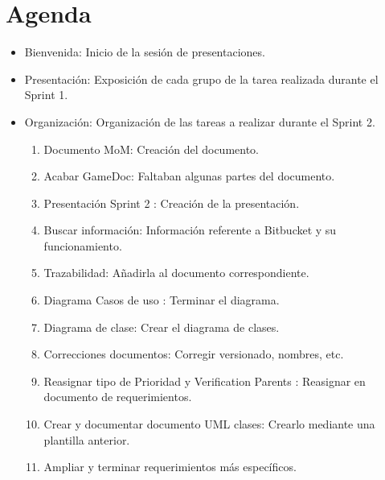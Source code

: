 \section{Agenda}

\begin{itemize}
\subsection{Sprint 1}
\item Bienvenida: Inicio de la sesión de presentaciones.
\item Presentación: Exposición de cada grupo de la tarea realizada durante el Sprint 1.
\item Organización: Organización de las tareas a realizar durante el Sprint 2.
\begin{enumerate}
\item Documento MoM: Creación del documento.
\item Acabar GameDoc: Faltaban algunas partes del documento.
\item Presentación Sprint 2 : Creación de la presentación.
\item Buscar información: Información referente a Bitbucket y su funcionamiento.
\item Trazabilidad: Añadirla al documento correspondiente.
\item Diagrama Casos de uso : Terminar el diagrama.
\item Diagrama de clase: Crear el diagrama de clases.
\item Correcciones documentos: Corregir versionado, nombres, etc.
\item Reasignar tipo de Prioridad y Verification Parents : Reasignar en documento de requerimientos.
\item Crear y documentar documento UML clases: Crearlo mediante una plantilla anterior.
\item Ampliar y terminar requerimientos más específicos.
\end{enumerate}




\end{itemize}
